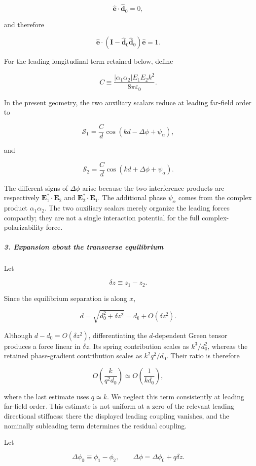 \[
\hat{\mathbf e}\cdot\hat{\mathbf d}_0=0,
\]

and therefore

\[
\hat{\mathbf e}\cdot \left(\mathbf I-\hat{\mathbf d}_0\hat{\mathbf d}_0\right) \hat{\mathbf e} =1.
\]

For the leading longitudinal term retained below, define

\[
C\equiv \frac{|\alpha_1\alpha_2|E_1E_2k^2}{8\pi\varepsilon_0}.
\]

In the present geometry, the two auxiliary scalars reduce at leading
far-field order to

\[
\mathcal S_1 = \frac{C}{d}
\cos(kd-\Delta\phi+\psi_\alpha),
\]

and

\[
\mathcal S_2 = \frac{C}{d}
\cos(kd+\Delta\phi+\psi_\alpha).
\]

The different signs of $\Delta\phi$ arise because the two interference
products are respectively $\mathbf E_1^*\cdot\mathbf E_2$ and
$\mathbf E_2^*\cdot\mathbf E_1$.  The additional phase $\psi_\alpha$ comes
from the complex product $\alpha_1\alpha_2$.  The two auxiliary scalars merely
organize the leading forces compactly; they are not a single interaction
potential for the full complex-polarizability force.

\subparagraph*{3. Expansion about the transverse equilibrium}

Let

\[
\delta z\equiv z_1-z_2.
\]

Since the equilibrium separation is along $x$,

\[
d=\sqrt{d_0^2+\delta z^2} =d_0+O(\delta z^2).
\]

Although $d-d_0=O(\!\delta z^2)$, differentiating the $d$-dependent Green
tensor produces a force linear in $\delta z$.  Its spring contribution scales
as $k^3/d_0^2$, whereas the retained phase-gradient contribution scales as
$k^2q^2/d_0$.  Their ratio is therefore

\[
O\!\left(\frac{k}{q^2d_0}\right)
\simeq O\!\left(\frac{1}{kd_0}\right),
\]

where the last estimate uses $q\simeq k$.  We neglect this term consistently
at leading far-field order.  This estimate is not uniform at a zero of the
relevant leading directional stiffness: there the displayed leading coupling
vanishes, and the nominally subleading term determines the residual coupling.

Let

\[
\Delta\phi_0\equiv\phi_1-\phi_2, \qquad \Delta\phi=\Delta\phi_0+q\delta z.
\]

